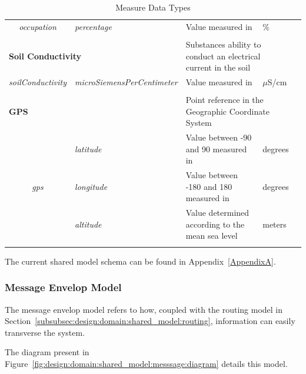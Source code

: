\begin{landscape}
\begin{longtable}{cllll}
   \textit{occupation}                   & \textit{percentage}                & Value measured in                                      & \%                             &  \\ [0.4em] \cline{1-4}
   \\[-0.85em]
   \multicolumn{2}{l}{\textbf{Soil Conductivity}}                             & \multicolumn{2}{l}{Substances ability to conduct an electrical current in the soil}     &  \\
   \textit{soilConductivity}             & \textit{microSiemensPerCentimeter} & Value measured in                                      & $\mu$S/cm                      &  \\ [0.4em] \cline{1-4}
   \\[-0.85em]
   \multicolumn{2}{l}{\textbf{GPS}}                                           & \multicolumn{2}{l}{Point reference in the Geographic Coordinate System}                 &  \\
   \multirow{3}{*}{\textit{gps}}         & \textit{latitude}                  & Value between -90 and 90 measured in                   & degrees                        &  \\
                                         & \textit{longitude}                 & Value between -180 and 180 measured in                 & degrees                        &  \\
                                         & \textit{altitude}                  & Value determined according to the mean sea level       & meters                         &  \\ [0.4em] \cline{1-4}
   \caption{Measure Data Types}
   \label{tab:design:domain:shared_model:data:data_types}\\
   \end{longtable}
\end{landscape}

The current shared model schema can be found in Appendix~\ref{AppendixA}.

\subsubsection*{Message Envelop Model}
\label{subsubsec:design:domain:shared_model:message}

The message envelop model refers to how, coupled with the routing model in Section~\ref{subsubsec:design:domain:shared_model:routing}, information can easily transverse the system.

The diagram present in Figure~\ref{fig:design:domain:shared_model:messsage:diagram} details this model.

